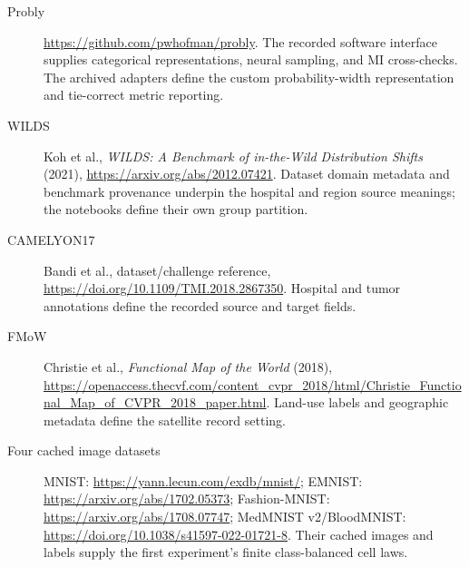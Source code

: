 \documentclass[11pt,a4paper]{report}
\begin{document}
\begin{description}
\item[Probly] \url{https://github.com/pwhofman/probly}. The recorded software interface supplies categorical representations, neural sampling, and MI cross-checks. The archived adapters define the custom probability-width representation and tie-correct metric reporting.
\item[WILDS] Koh et al., \emph{WILDS: A Benchmark of in-the-Wild Distribution Shifts} (2021), \url{https://arxiv.org/abs/2012.07421}. Dataset domain metadata and benchmark provenance underpin the hospital and region source meanings; the notebooks define their own group partition.
\item[CAMELYON17] Bandi et al., dataset/challenge reference, \url{https://doi.org/10.1109/TMI.2018.2867350}. Hospital and tumor annotations define the recorded source and target fields.
\item[FMoW] Christie et al., \emph{Functional Map of the World} (2018), \url{https://openaccess.thecvf.com/content_cvpr_2018/html/Christie_Functional_Map_of_CVPR_2018_paper.html}. Land-use labels and geographic metadata define the satellite record setting.
\item[Four cached image datasets] MNIST: \url{https://yann.lecun.com/exdb/mnist/}; EMNIST: \url{https://arxiv.org/abs/1702.05373}; Fashion-MNIST: \url{https://arxiv.org/abs/1708.07747}; MedMNIST v2/BloodMNIST: \url{https://doi.org/10.1038/s41597-022-01721-8}. Their cached images and labels supply the first experiment's finite class-balanced cell laws.
\end{description}
\end{document}
